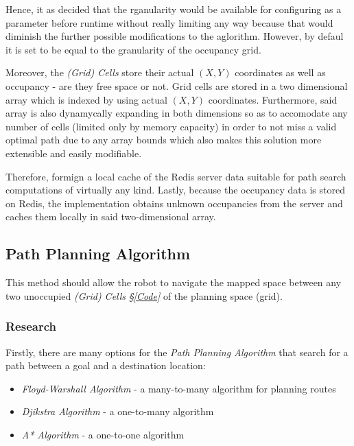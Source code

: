 \documentclass[11pt, a4paper]{article}
\begin{document}
Hence, it as decided that the rganularity would be available for configuring as a parameter before runtime without really limiting any way because that would diminish the further possible modifications to the aglorithm. However, by defaul it is set to be equal to the granularity of the occupancy grid.

Moreover, the \textit{(Grid) Cells} store their actual $(X ,Y)$ coordinates as well as occupancy - are they free space or not. Grid cells are stored in a two dimensional array which is indexed by using actual $(X ,Y)$ coordinates. Furthermore, said array is also dynamycally expanding in both dimensions so as to accomodate any number of cells (limited only by memory capacity) in order to not miss a valid optimal path due to any array bounds which also makes this solution more extensible and easily modifiable.

Therefore, formign a local cache of the Redis server data suitable for path search computations of virtually any kind. Lastly, because the occupancy data is stored on Redis, the implementation obtains unknown occupancies from the server and caches them locally in said two-dimensional array. 




\subsection{Path Planning Algorithm}
\label{Path_Planning_Algorithm}

This method should allow the robot to navigate the mapped space between any two unoccupied \textit{(Grid) Cells} \textit{\S\ref{Code}} of the planning space (grid). 

\subsubsection{Research}

Firstly, there are many options for the \textit{Path Planning Algorithm} that search for a path between a goal and a destination location:

\begin{itemize}

	\item \textit{Floyd-Warshall Algorithm}\cite{path_warshall} - a many-to-many algorithm for planning routes
	\item \textit{Djikstra Algorithm}\cite{path_warshall} - a one-to-many algorithm
	\item \textit{A* Algorithm}\cite{path_astar}	- a one-to-one algorithm

\end{itemize}
\end{document}
